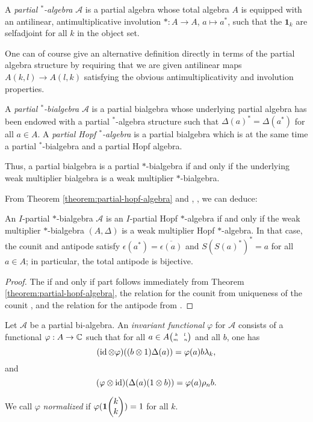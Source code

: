 \begin{Def} A \emph{partial $^*$-algebra} $\mathscr{A}$ is a partial
  algebra whose total algebra $A$ is equipped with an antilinear,
  antimultiplicative involution $*\colon A\rightarrow A$, $ a\mapsto
  a^*$,  such that the $\mathbf{1}_k$ are selfadjoint for all $k$ in
  the object set. 
\end{Def} 

One can of course give an alternative definition directly in terms of the partial algebra structure by requiring that we are given antilinear maps $A(k,l)\rightarrow A(l,k)$ satisfying the obvious antimultiplicativity and involution properties.

\begin{Def} A \emph{partial $^*$-bialgebra} $\mathscr{A}$ is a
 partial bialgebra whose underlying partial algebra has been
  endowed with a partial $^*$-algebra structure such that
$\Delta(a)^* = \Delta(a^*)$ for all $a \in A$.
A \emph{partial Hopf $^*$-algebra} is a partial bialgebra which is at the same time a partial $^*$-bialgebra and a partial Hopf algebra.
\end{Def} 
Thus, a partial bialgebra is a partial
$*$-bialgebra if and only if the underlying weak multiplier bialgebra
 is a weak multiplier $*$-bialgebra.

From Theorem \ref{theorem:partial-hopf-algebra} and \cite{Boh1},
\cite{VDW1}, we can deduce:
\begin{Cor}
  An $I$-partial $*$-bialgebra $\mathscr{A}$ is an $I$-partial Hopf
  $*$-algebra if and only if the weak multiplier $*$-bialgebra
  $(A,\Delta)$ is a weak multiplier Hopf $*$-algebra. In that case,
  the counit and antipode satisfy
  $\epsilon(a^{*})=\overline{\epsilon(a)}$ and $S(S(a)^{*})^{*}=a$ for
  all $a\in A$; in particular, the total antipode is bijective.
\end{Cor}
\begin{proof}
  The if and only if part follows immediately from  Theorem
  \ref{theorem:partial-hopf-algebra}, the relation for the counit  from
uniqueness of the counit  \cite[Theorem 2.8]{Boh1}, and the relation
for the antipode from \cite[Proposition 4.11]{VDW1}.
\end{proof}



\begin{Def} Let $\mathscr{A}$ be a partial bi-algebra. An \emph{invariant functional} $\varphi$ for $\mathscr{A}$ consists of a functional $\varphi:A\rightarrow \mathbb{C}$ %
such that for all $a\in A{{\tiny \begin{pmatrix} k \quad l \\ m \quad n\end{pmatrix}}}$ and all $b$, one has  \[(\operatorname{id}\otimes \varphi)((b\otimes 1)\Delta(a)) = \varphi(a)b\lambda_k,\] and \[(\varphi\otimes \operatorname{id})(\Delta(a)(1\otimes b)) = \varphi(a)\rho_nb.\]

We call $\varphi$ \emph{normalized} if $\varphi(\mathbf{1}\!\begin{pmatrix} k \\ k\end{pmatrix}) = 1$ for all $k$. 
\end{Def} %

